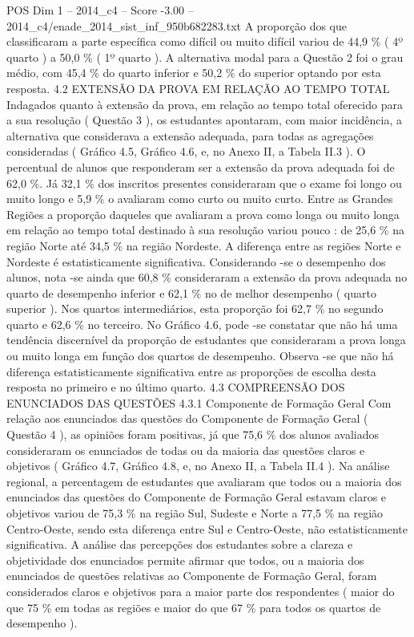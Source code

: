 \begin{textsample}{POS Dim 1 – 2014\_c4 – Score -3.00 – 2014\_c4/enade\_2014\_sist\_inf\_950b682283.txt}
A proporção dos que classificaram a parte específica como difícil ou muito difícil variou de 44,9 \% ( 4º quarto ) a 50,0 \% ( 1º quarto ).
A alternativa modal para a Questão 2 foi o grau médio, com 45,4 \% do quarto inferior e 50,2 \% do superior optando por esta resposta. 4.2 EXTENSÃO DA PROVA EM RELAÇÃO AO TEMPO TOTAL Indagados quanto à extensão da prova, em relação ao tempo total oferecido para a sua resolução ( Questão 3 ), os estudantes apontaram, com maior incidência, a alternativa que considerava a extensão adequada, para todas as agregações consideradas ( Gráfico 4.5, Gráfico 4.6, e, no Anexo II, a Tabela II.3 ).
O percentual de alunos que responderam ser a extensão da prova adequada foi de 62,0 \%.
Já 32,1 \% dos inscritos presentes consideraram que o exame foi longo ou muito longo e 5,9 \% o avaliaram como curto ou muito curto.
Entre as Grandes Regiões a proporção daqueles que avaliaram a prova como longa ou muito longa em relação ao tempo total destinado à sua resolução variou pouco : de 25,6 \% na região Norte até 34,5 \% na região Nordeste.
A diferença entre as regiões Norte e Nordeste é estatisticamente significativa.
Considerando -se o desempenho dos alunos, nota -se ainda que 60,8 \% consideraram a extensão da prova adequada no quarto de desempenho inferior e 62,1 \% no de melhor desempenho ( quarto superior ).
Nos quartos intermediários, esta proporção foi 62,7 \% no segundo quarto e 62,6 \% no terceiro.
No Gráfico 4.6, pode -se constatar que não há uma tendência discernível da proporção de estudantes que consideraram a prova longa ou muito longa em função dos quartos de desempenho.
Observa -se que não há diferença estatisticamente significativa entre as proporções de escolha desta resposta no primeiro e no último quarto. 4.3 COMPREENSÃO DOS ENUNCIADOS DAS QUESTÕES 4.3.1 Componente de Formação Geral Com relação aos enunciados das questões do Componente de Formação Geral ( Questão 4 ), as opiniões foram positivas, já que 75,6 \% dos alunos avaliados consideraram os enunciados de todas ou da maioria das questões claros e objetivos ( Gráfico 4.7, Gráfico 4.8, e, no Anexo II, a Tabela II.4 ).
Na análise regional, a percentagem de estudantes que avaliaram que todos ou a maioria dos enunciados das questões do Componente de Formação Geral estavam claros e objetivos variou de 75,3 \% na região Sul, Sudeste e Norte a 77,5 \% na região Centro-Oeste, sendo esta diferença entre Sul e Centro-Oeste, não estatisticamente significativa.
A análise das percepções dos estudantes sobre a clareza e objetividade dos enunciados permite afirmar que todos, ou a maioria dos enunciados de questões relativas ao Componente de Formação Geral, foram considerados claros e objetivos para a maior parte dos respondentes ( maior do que 75 \% em todas as regiões e maior do que 67 \% para todos os quartos de desempenho ).

\end{textsample}
